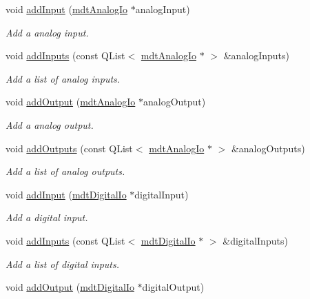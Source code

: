 \begin{DoxyCompactItemize}
void \hyperlink{classmdt_device_ae887c9c83fa090c16717d75905e1079d}{add\-Input} (\hyperlink{classmdt_analog_io}{mdt\-Analog\-Io} $\ast$analog\-Input)
\begin{DoxyCompactList}\small\item\em Add a analog input. \end{DoxyCompactList}\item 
void \hyperlink{classmdt_device_af5fd61d58c5b305f61ad706c13d658d2}{add\-Inputs} (const Q\-List$<$ \hyperlink{classmdt_analog_io}{mdt\-Analog\-Io} $\ast$ $>$ \&analog\-Inputs)
\begin{DoxyCompactList}\small\item\em Add a list of analog inputs. \end{DoxyCompactList}\item 
void \hyperlink{classmdt_device_a7acf4cc331c003fd6d30190d54242da1}{add\-Output} (\hyperlink{classmdt_analog_io}{mdt\-Analog\-Io} $\ast$analog\-Output)
\begin{DoxyCompactList}\small\item\em Add a analog output. \end{DoxyCompactList}\item 
void \hyperlink{classmdt_device_aac8600604fb55c70e84e100e3af8887a}{add\-Outputs} (const Q\-List$<$ \hyperlink{classmdt_analog_io}{mdt\-Analog\-Io} $\ast$ $>$ \&analog\-Outputs)
\begin{DoxyCompactList}\small\item\em Add a list of analog outputs. \end{DoxyCompactList}\item 
void \hyperlink{classmdt_device_a186861ad3b8857ba045534244fb9f9ef}{add\-Input} (\hyperlink{classmdt_digital_io}{mdt\-Digital\-Io} $\ast$digital\-Input)
\begin{DoxyCompactList}\small\item\em Add a digital input. \end{DoxyCompactList}\item 
void \hyperlink{classmdt_device_a9dbe6a03ca719a17f615cd59ce1fd46d}{add\-Inputs} (const Q\-List$<$ \hyperlink{classmdt_digital_io}{mdt\-Digital\-Io} $\ast$ $>$ \&digital\-Inputs)
\begin{DoxyCompactList}\small\item\em Add a list of digital inputs. \end{DoxyCompactList}\item 
void \hyperlink{classmdt_device_a319cd0eeec028f3fc8cfcb96def79404}{add\-Output} (\hyperlink{classmdt_digital_io}{mdt\-Digital\-Io} $\ast$digital\-Output)

\end{DoxyCompactItemize}
